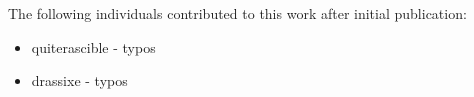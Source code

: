\begin{contributions}
The following individuals contributed to this work after initial publication:
\begin{itemize}
\item quiterascible - typos
\item drassixe - typos
\end{itemize}
\end{contributions}